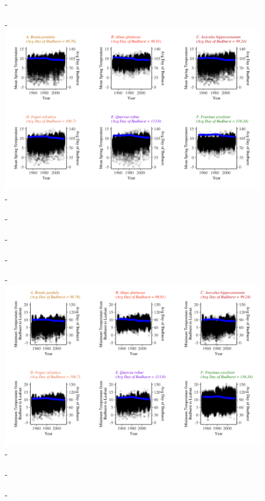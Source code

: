 \documentclass{article}\usepackage[]{graphicx}\usepackage[]{color}
\begin{document}
{\begin{figure} [H]
  -\begin{center}
  -\includegraphics[width=12cm]{..//figures/MSTBB_bySpp.png}
  -\caption{}\label{fig:mst}
  -\end{center}
  -\end{figure}}
  
{\begin{figure} [H]
  -\begin{center}
  -\includegraphics[width=12cm]{..//figures/TminBB_bySpp.png}
  -\caption{}\label{fig:tmin}
  -\end{center}
  -\end{figure}}
  
  
\end{document}
